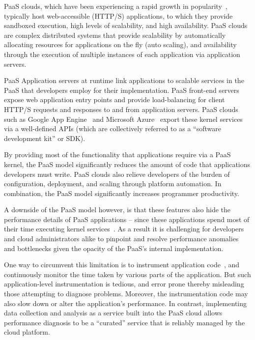 PaaS clouds, which have been experiencing a rapid growth in 
popularity~\cite{paas-growth,paas-growth2},
typically host web-accessible (HTTP/S) applications, to which they provide
sandboxed execution, high levels of scalability, and high availability.
PaaS clouds are complex distributed systems that
provide scalability by automatically allocating resources for
applications on the fly (auto scaling), and availability through the
execution of multiple instances of each application via 
application servers.  

PaaS Application servers at runtime link applications to 
scalable services in the PaaS that developers employ for their implementation.
PaaS front-end servers expose web application entry points and
provide load-balancing for client HTTP/S requests and responses
to and from application servers.
PaaS clouds such as Google App Engine~\cite{gae} 
and Microsoft Azure~\cite{azure} export these kernel services via a 
well-defined APIs (which are collectively referred to as 
a ``software development kit'' or SDK). 

By providing most of the functionality that applications require via
a PaaS kernel, the PaaS model significantly reduces the amount of code that applications developers
must write.  PaaS clouds also relieve developers of the burden of configuration, 
deployment, and scaling through platform automation.  In combination, the PaaS model
significantly increases programmer productivity.

A downside of the PaaS model however, is that these features also hide
the performance details of PaaS applications -- 
since these applications spend most of their time executing kernel 
services~\cite{Jayathilaka:2015:RTS:2806777.2806842}.
As a result it is challenging for developers and cloud administrators alike to 
pinpoint and resolve performance anomalies and bottlenecks given the
opacity of the PaaS's internal implementation. 

One way to circumvent this 
limitation is to instrument application code~\cite{newrelic,datadog,dynatrace}, 
and continuously monitor the time taken by various
parts of the application. But such application-level instrumentation is tedious, and
error prone thereby misleading those attempting to diagnose problems.
Moreover, the instrumentation code may also slow down or alter the application's
performance. 
In contrast, implementing data collection and analysis as a service 
built into the PaaS cloud allows 
performance diagnosis to be a ``curated'' service that is 
reliably managed by the cloud platform.

